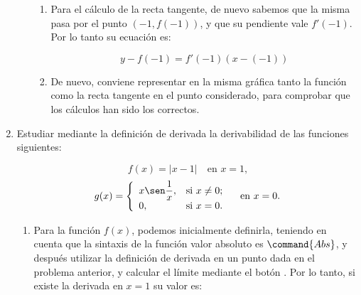 \begin{enumerate}[leftmargin=*]
\begin{enumerate}
\begin{indication}
{\begin{enumerate}
\[
f'(a) = \mathop {\lim }\limits_{h \to 0} \frac{{f(a + h) - f(a)}}
{h}
\]
en donde, por aligerar la notación, hemos llamado $h$ a lo que en la
teoría denominábamos $\Delta x$.

Por lo tanto, para calcular la derivada de la función $f$ en $a=-1$
mediante la definición, procedemos con:

\[
f'(-1) = \mathop {\lim }\limits_{h \to 0} \frac{{f(-1 + h) - f(-1)}}
{h}
\]

Para calcular el límite, podemos utilizar el botón  de la barra de botones.

\item Para el cálculo de la recta tangente, de nuevo sabemos que
la misma pasa por el punto $(-1, f(-1))$, y que su pendiente vale
$f'(-1)$. Por lo tanto su ecuación es:

\[
y - f( - 1) = f'(-1)\left( {x - ( - 1)} \right)
\]

\item De nuevo, conviene representar en la misma gráfica tanto la
función como la recta tangente en el punto considerado, para
comprobar que los cálculos han sido los correctos.

\end{enumerate}
}
\end{indication}


\end{enumerate}




\item Estudiar mediante la definición de derivada la derivabilidad
de las funciones siguientes:


\[
f(x)=|x-1| \quad \textrm{en $x=1$,}
\]
\[
g(x)=\left\{%
\begin{array}{ll}
   x \sen\dfrac{1}{x}, & \hbox{si $x\neq 0$;} \\
   0, & \hbox{si $x=0$.} \\
\end{array}%
\right. \quad \textrm{en $x=0$.}
\]

\begin{indication}
{
\begin{enumerate}
\item Para la función $f(x)$, podemos inicialmente definirla,
teniendo en cuenta que la sintaxis de la función valor absoluto es
$\command{Abs}$, y después utilizar la definición de derivada en un
punto dada en el problema anterior, y calcular el límite mediante el
botón . Por lo tanto, si existe la
derivada en $x=1$ su valor es:



\end{enumerate}}
\end{indication}
\end{enumerate}
